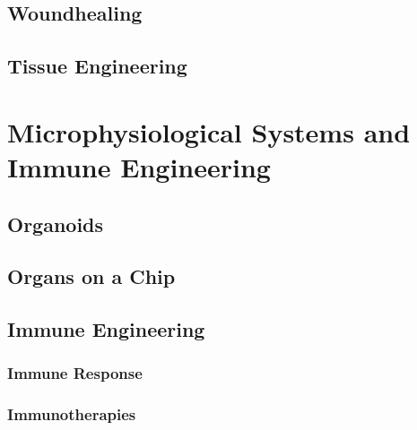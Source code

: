 \documentclass[12pt]{cheatsheet}
\begin{document}
\subsection*{Woundhealing}

\subsection*{Tissue Engineering}


\section*{Microphysiological Systems and Immune Engineering}
\subsection*{Organoids}

\subsection*{Organs on a Chip}

\subsection*{Immune Engineering}

\subsubsection*{Immune Response}

\subsubsection*{Immunotherapies}



\end{document}
